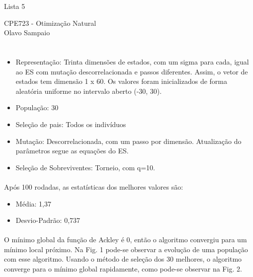 \documentclass{article}
\begin{document}
\begin{flushleft}
	\large{Lista 5}
\end{flushleft}

\begin{flushright}
{CPE723 - Otimização Natural} \\
{Olavo Sampaio}\\
   \vspace{1cm}
\end{flushright}

\section{}

\begin{itemize}
	\item[] Representação: Trinta dimensões de estados, com um sigma para cada, igual ao ES com mutação descorrelacionada e passos diferentes. Assim, o vetor de estados tem dimensão 1 x 60. Os valores foram inicializados de forma aleatória uniforme no intervalo aberto (-30, 30).
	\item[] População: 30
	\item[] Seleção de pais: Todos os indivíduos
	\item[] Mutação: Descorrelacionada, com um passo por dimensão. Atualização do parâmetros segue as equações do ES.
	\item[] Seleção de Sobreviventes: Torneio, com q=10.

\end{itemize}

\paragraph{}Após 100 rodadas, as estatísticas dos melhores valores são:
\begin{itemize}
	\item[] Média: \hspace{1.1cm} 1,37
	\item[] Desvio-Padrão:	0,737
\end{itemize}

\paragraph{}O mínimo global da função de Ackley é 0, então o algoritmo convergiu para um mínimo local próximo.
Na Fig. 1 pode-se observar a evolução de uma população com esse algoritmo.
Usando o método de seleção dos 30 melhores, o algoritmo converge para o mínimo global rapidamente, como pode-se observar na Fig. 2.
\end{document}
